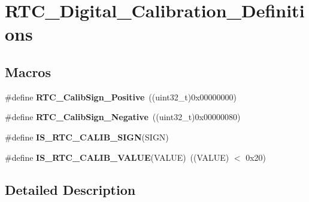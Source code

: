 \hypertarget{group___r_t_c___digital___calibration___definitions}{\section{R\-T\-C\-\_\-\-Digital\-\_\-\-Calibration\-\_\-\-Definitions}
\label{group___r_t_c___digital___calibration___definitions}
}
\subsection*{Macros}
\begin{DoxyCompactItemize}
\item 
\hypertarget{group___r_t_c___digital___calibration___definitions_gaf3e952081f1b3e73b9abc9a53ce465bb}{\#define {\bfseries R\-T\-C\-\_\-\-Calib\-Sign\-\_\-\-Positive}~((uint32\-\_\-t)0x00000000)}\label{group___r_t_c___digital___calibration___definitions_gaf3e952081f1b3e73b9abc9a53ce465bb}

\item 
\hypertarget{group___r_t_c___digital___calibration___definitions_ga362c7fef775bee9999bc19a9b47175f7}{\#define {\bfseries R\-T\-C\-\_\-\-Calib\-Sign\-\_\-\-Negative}~((uint32\-\_\-t)0x00000080)}\label{group___r_t_c___digital___calibration___definitions_ga362c7fef775bee9999bc19a9b47175f7}

\item 
\#define {\bfseries I\-S\-\_\-\-R\-T\-C\-\_\-\-C\-A\-L\-I\-B\-\_\-\-S\-I\-G\-N}(S\-I\-G\-N)
\item 
\hypertarget{group___r_t_c___digital___calibration___definitions_gafa25555b5daedee7b1fcba41afa6ed8b}{\#define {\bfseries I\-S\-\_\-\-R\-T\-C\-\_\-\-C\-A\-L\-I\-B\-\_\-\-V\-A\-L\-U\-E}(V\-A\-L\-U\-E)~((V\-A\-L\-U\-E) $<$ 0x20)}\label{group___r_t_c___digital___calibration___definitions_gafa25555b5daedee7b1fcba41afa6ed8b}

\end{DoxyCompactItemize}


\subsection{Detailed Description}


